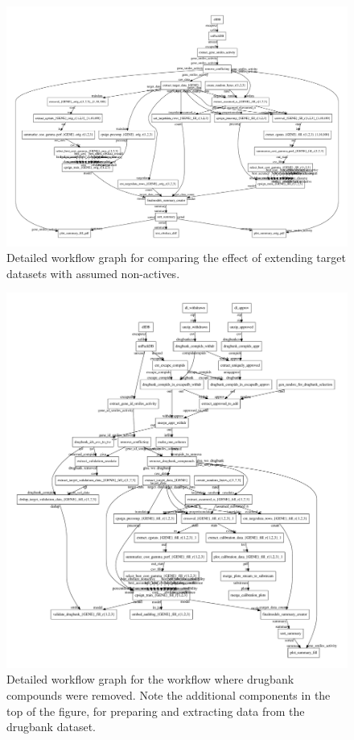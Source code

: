 \documentclass[utf8]{frontiersSCNS} %
\begin{document}
\begin{figure}[h!]
\includegraphics[width=\textwidth]{figures/workflow_graph_fillup_vs_not.pdf}
    \caption{Detailed workflow graph for comparing the effect of extending
    target datasets with assumed non-actives.}
    \label{fig:workflow_detailed_fillup_vs_not}
\end{figure}

\begin{figure}[h!]
\includegraphics[width=\textwidth]{figures/workflow_graph_wo_drugbank.pdf}
    \caption{Detailed workflow graph for the workflow where drugbank compounds
    were removed. Note the additional components in the top of the figure, for
    preparing and extracting data from the drugbank dataset.}
    \label{fig:workflow_detailed_wo_drugbank}
\end{figure}
\end{document}
